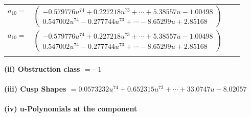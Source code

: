 \documentclass[1p]{elsarticle_modified}
\theoremstyle{definition}
\begin{document}
\begin{tabular}{m{7pt} m{180pt} m{7pt} m{180pt} }
\flushright $a_{10}=$&$\begin{pmatrix}-0.579776 u^{74}+0.227218 u^{73}+\cdots+5.38557 u-1.00498\\0.547002 u^{74}-0.277744 u^{73}+\cdots-8.65299 u+2.85168\end{pmatrix}$\\ \flushright $a_{10}=$&$\begin{pmatrix}-0.579776 u^{74}+0.227218 u^{73}+\cdots+5.38557 u-1.00498\\0.547002 u^{74}-0.277744 u^{73}+\cdots-8.65299 u+2.85168\end{pmatrix}$\\&\end{tabular}
\flushleft \textbf{(ii) Obstruction class $= -1$}\\~\\
\flushleft \textbf{(iii) Cusp Shapes $= 0.0573232 u^{74}+0.652315 u^{73}+\cdots+33.0747 u-8.02057$}\\~\\
\newpage\renewcommand{\arraystretch}{1}
\flushleft \textbf{(iv) u-Polynomials at the component}\newline \\
\end{document}
